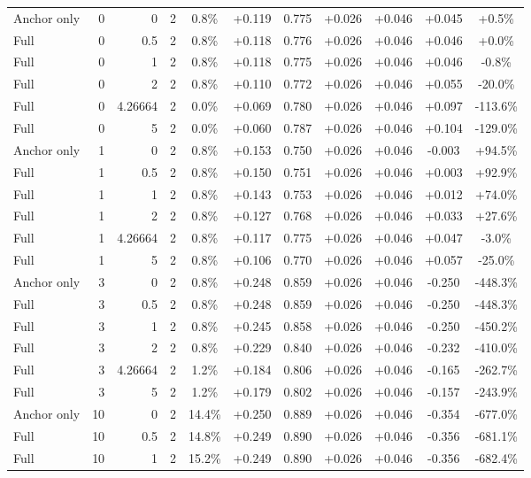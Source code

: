 \begin{table}[htbp]
\begin{tabular}{lrrrccccccc}
Anchor only & 0 & 0 & 2 & 0.8\% & +0.119 & 0.775 & +0.026 & +0.046 & +0.045 & +0.5\% \\
Full & 0 & 0.5 & 2 & 0.8\% & +0.118 & 0.776 & +0.026 & +0.046 & +0.046 & +0.0\% \\
Full & 0 & 1 & 2 & 0.8\% & +0.118 & 0.775 & +0.026 & +0.046 & +0.046 & -0.8\% \\
Full & 0 & 2 & 2 & 0.8\% & +0.110 & 0.772 & +0.026 & +0.046 & +0.055 & -20.0\% \\
Full & 0 & 4.26664 & 2 & 0.0\% & +0.069 & 0.780 & +0.026 & +0.046 & +0.097 & -113.6\% \\
Full & 0 & 5 & 2 & 0.0\% & +0.060 & 0.787 & +0.026 & +0.046 & +0.104 & -129.0\% \\
Anchor only & 1 & 0 & 2 & 0.8\% & +0.153 & 0.750 & +0.026 & +0.046 & -0.003 & +94.5\% \\
Full & 1 & 0.5 & 2 & 0.8\% & +0.150 & 0.751 & +0.026 & +0.046 & +0.003 & +92.9\% \\
Full & 1 & 1 & 2 & 0.8\% & +0.143 & 0.753 & +0.026 & +0.046 & +0.012 & +74.0\% \\
Full & 1 & 2 & 2 & 0.8\% & +0.127 & 0.768 & +0.026 & +0.046 & +0.033 & +27.6\% \\
Full & 1 & 4.26664 & 2 & 0.8\% & +0.117 & 0.775 & +0.026 & +0.046 & +0.047 & -3.0\% \\
Full & 1 & 5 & 2 & 0.8\% & +0.106 & 0.770 & +0.026 & +0.046 & +0.057 & -25.0\% \\
Anchor only & 3 & 0 & 2 & 0.8\% & +0.248 & 0.859 & +0.026 & +0.046 & -0.250 & -448.3\% \\
Full & 3 & 0.5 & 2 & 0.8\% & +0.248 & 0.859 & +0.026 & +0.046 & -0.250 & -448.3\% \\
Full & 3 & 1 & 2 & 0.8\% & +0.245 & 0.858 & +0.026 & +0.046 & -0.250 & -450.2\% \\
Full & 3 & 2 & 2 & 0.8\% & +0.229 & 0.840 & +0.026 & +0.046 & -0.232 & -410.0\% \\
Full & 3 & 4.26664 & 2 & 1.2\% & +0.184 & 0.806 & +0.026 & +0.046 & -0.165 & -262.7\% \\
Full & 3 & 5 & 2 & 1.2\% & +0.179 & 0.802 & +0.026 & +0.046 & -0.157 & -243.9\% \\
Anchor only & 10 & 0 & 2 & 14.4\% & +0.250 & 0.889 & +0.026 & +0.046 & -0.354 & -677.0\% \\
Full & 10 & 0.5 & 2 & 14.8\% & +0.249 & 0.890 & +0.026 & +0.046 & -0.356 & -681.1\% \\
Full & 10 & 1 & 2 & 15.2\% & +0.249 & 0.890 & +0.026 & +0.046 & -0.356 & -682.4\% \\

\end{tabular}
\end{table}
